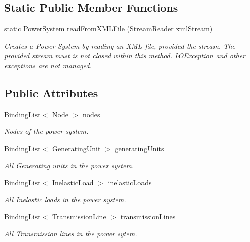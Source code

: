 \subsection*{Static Public Member Functions}
\begin{DoxyCompactItemize}
\item 
static \hyperlink{class_power_system_planning_1_1_power_system}{Power\+System} \hyperlink{class_power_system_planning_1_1_power_system_ad61746fe7b02b94761abec0f022d106a}{read\+From\+X\+M\+L\+File} (Stream\+Reader xml\+Stream)
\begin{DoxyCompactList}\small\item\em Creates a Power System by reading an X\+ML file, provided the stream. The provided stream must is not closed within this method. I\+O\+Exception and other exceptions are not managed. \end{DoxyCompactList}\end{DoxyCompactItemize}
\subsection*{Public Attributes}
\begin{DoxyCompactItemize}
\item 
Binding\+List$<$ \hyperlink{class_power_system_planning_1_1_node}{Node} $>$ \hyperlink{class_power_system_planning_1_1_power_system_aa5709bbb488708bcb162646585f01c79}{nodes}
\begin{DoxyCompactList}\small\item\em Nodes of the power system. \end{DoxyCompactList}\item 
Binding\+List$<$ \hyperlink{class_power_system_planning_1_1_generating_unit}{Generating\+Unit} $>$ \hyperlink{class_power_system_planning_1_1_power_system_a899692153e8c860b54745c503f8af765}{generating\+Units}
\begin{DoxyCompactList}\small\item\em All Generating units in the power system. \end{DoxyCompactList}\item 
Binding\+List$<$ \hyperlink{class_power_system_planning_1_1_inelastic_load}{Inelastic\+Load} $>$ \hyperlink{class_power_system_planning_1_1_power_system_a0445fbb84b2deb936cfc1b7b38d8f5ed}{inelastic\+Loads}
\begin{DoxyCompactList}\small\item\em All Inelastic loads in the power system. \end{DoxyCompactList}\item 
Binding\+List$<$ \hyperlink{class_power_system_planning_1_1_transmission_line}{Transmission\+Line} $>$ \hyperlink{class_power_system_planning_1_1_power_system_a1394f9c3a23efcc0cd93acb46611c102}{transmission\+Lines}
\begin{DoxyCompactList}\small\item\em All Transmission lines in the power sytem. \end{DoxyCompactList}\end{DoxyCompactItemize}
